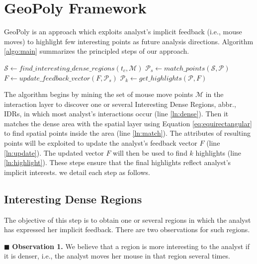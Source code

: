 \section{GeoPoly Framework}
\label{sec:algo}
{\sc GeoPoly} is an approach which exploits analyst's implicit feedback (i.e., mouse moves) to highlight few interesting points as future analysis directions. Algorithm \ref{algo:main} summarizes the principled steps of our approach.

\begin{algorithm}[t]
\DontPrintSemicolon
{}
$\mathcal{S} \gets \mathit{find\_interesting\_dense\_regions}(t_c,\mathcal{M})$\label{ln:dense}\;
$\mathcal{P}_s \gets \mathit{match\_points}(\mathcal{S}, \mathcal{P})$\label{ln:match}\;
$F \gets \mathit{update\_feedback\_vector}(F, \mathcal{P}_s)$\label{ln:update}\;
$\mathcal{P}_k \gets \mathit{get\_highlights}(\mathcal{P}, F)$\label{ln:highlight}\;
\; 
\caption{{\sc GeoPoly} Algorithm}
\label{algo:main}
\end{algorithm}

\vspace{2pt}
The algorithm begins by mining the set of mouse move points $\mathcal{M}$ in the interaction layer to discover one or several Interesting Dense Regions, abbr., IDRs, in which most analyst's interactions occur (line \ref{ln:dense}). Then it matches the dense area with the spatial layer using Equation \ref{eq:equirectangular} to find spatial points inside the area (line \ref{ln:match}). The attributes of resulting points will be exploited to update the analyst's feedback vector $F$ (line \ref{ln:update}). The updated vector $F$ will then be used to find $k$ highlights (line \ref{ln:highlight}). These steps ensure that the final highlights reflect analyst's implicit interests. we detail each step as follows.

\subsection{Interesting Dense Regions}
The objective of this step is to obtain one or several regions in which the analyst has expressed her implicit feedback. There are two observations for such regions.

\vspace{2pt}
\noindent $\blacksquare$ {\bf Observation 1.} We believe that a region is more interesting to the analyst if it is denser, i.e., the analyst moves her mouse in that region several times.

